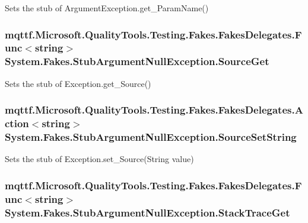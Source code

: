 Sets the stub of Argument\-Exception.\-get\-\_\-\-Param\-Name()

\hypertarget{class_system_1_1_fakes_1_1_stub_argument_null_exception_a2ee7f05831c9ff94f094e7ce144e43ab}{
\subsubsection[{Source\-Get}]{\setlength{\rightskip}{0pt plus 5cm}mqttf.\-Microsoft.\-Quality\-Tools.\-Testing.\-Fakes.\-Fakes\-Delegates.\-Func$<$string$>$ System.\-Fakes.\-Stub\-Argument\-Null\-Exception.\-Source\-Get}}\label{class_system_1_1_fakes_1_1_stub_argument_null_exception_a2ee7f05831c9ff94f094e7ce144e43ab}


Sets the stub of Exception.\-get\-\_\-\-Source()

\hypertarget{class_system_1_1_fakes_1_1_stub_argument_null_exception_a2900a63f752258cb7eba21b6cc90e003}{
\subsubsection[{Source\-Set\-String}]{\setlength{\rightskip}{0pt plus 5cm}mqttf.\-Microsoft.\-Quality\-Tools.\-Testing.\-Fakes.\-Fakes\-Delegates.\-Action$<$string$>$ System.\-Fakes.\-Stub\-Argument\-Null\-Exception.\-Source\-Set\-String}}\label{class_system_1_1_fakes_1_1_stub_argument_null_exception_a2900a63f752258cb7eba21b6cc90e003}


Sets the stub of Exception.\-set\-\_\-\-Source(\-String value)

\hypertarget{class_system_1_1_fakes_1_1_stub_argument_null_exception_aabb859ba936a0ece0e9dcc7ec944abf2}{
\subsubsection[{Stack\-Trace\-Get}]{\setlength{\rightskip}{0pt plus 5cm}mqttf.\-Microsoft.\-Quality\-Tools.\-Testing.\-Fakes.\-Fakes\-Delegates.\-Func$<$string$>$ System.\-Fakes.\-Stub\-Argument\-Null\-Exception.\-Stack\-Trace\-Get}}\label{class_system_1_1_fakes_1_1_stub_argument_null_exception_aabb859ba936a0ece0e9dcc7ec944abf2}


